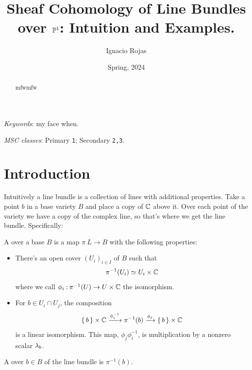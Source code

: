 \documentclass[12pt]{memoir}
\title{Sheaf Cohomology of Line Bundles over $\mathbb{P}^1$: Intuition and Examples.}
\author{Ignacio Rojas}
\date{Spring, 2024}
\begin{document}
\bgroup
\renewcommand\thesection{\arabic{section}}
\renewcommand{\thefigure}{\arabic{figure}}
\maketitle
\begin{abstract}
    mfwmfw
    \end{abstract}
    
    \begin{flushleft}
    \small
    \emph{Keywords}:
    my face when.
    
    \emph{MSC classes}:  Primary \texttt{1}; Secondary \texttt{2,3}.
    \end{flushleft}
    \section{Introduction}

    Intuitively a line bundle is a collection of lines with additional properties. Take a point $b$ in a base variety $B$ and place a copy of $\mathbb{C}$ above it. Over each point of the variety we have a copy of the complex line, so that's where we get the line bundle. Specifically:

    \begin{Def}
        A  over a base $B$ is a map $\pi\: L\to B$ with the following properties:
        \begin{itemize}
            \item There's an open cover $(U_i)_{i\in I}$ of $B$ such that 
            $$\pi^{-1}(U_i)\simeq U_i\times\mathbb{C}$$
            where we call $\phi_i\mathbin{:}\pi^{-1}(U)\to U\times\mathbb{C}$ the isomorphism.
            \item For $b\in U_i\cap U_j$, the composition
            $$\{\,b\,\}\times\mathbb{C}\xrightarrow[]{\phi_i^{-1}}\pi^{-1}(b)\xrightarrow[]{\phi_j}\{\,b\,\}\times\mathbb{C}$$
            is a linear isomorphism. This map, $\phi_j\phi_i^{-1}$, is multiplication by a nonzero scalar $\lambda_b$.
        \end{itemize}
        A  over $b\in B$ of the line bundle is $\pi^{-1}(b)$.
    \end{Def}
    
\end{document}
